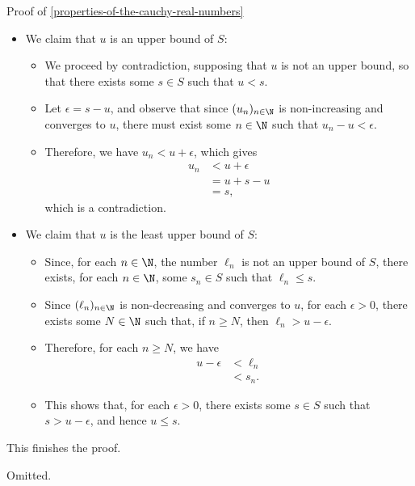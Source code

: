\begin{Proof}{Proof of \cref{properties-of-the-cauchy-real-numbers}}
\begin{itemize}
\begin{itemize}
                    so $(\ell_{n})_{n\in\N}$ converges to $u$.
            \end{itemize}
        \item We claim that $u$ is an upper bound of $S$:
            \begin{itemize}
                \item We proceed by contradiction, supposing that $u$ is not an upper bound, so that there exists some $s\in S$ such that $u\lt s$.
                \item Let $\epsilon=s-u$, and observe that since $(u_{n})_{n\in\N}$ is non-increasing and converges to $u$, there must exist some $n\in\N$ such that $u_{n}-u\lt\epsilon$.
                \item Therefore, we have $u_{n}\lt u+\epsilon$, which gives
                    \begin{align*}
                        u_{n} &\lt u+\epsilon\\
                              &=     u+s-u\\
                              &=     s,
                    \end{align*}
                    which is a contradiction.
            \end{itemize}
        \item We claim that $u$ is the least upper bound of $S$:
            \begin{itemize}
                \item Since, for each $n\in\N$, the number $\ell_{n}$ is not an upper bound of $S$, there exists, for each $n\in\N$, some $s_{n}\in S$ such that $\ell_{n}\leq s$.
                \item Since $(\ell_{n})_{n\in\N}$ is non-decreasing and converges to $u$, for each $\epsilon\gt0$, there exists some $N\in\N$ such that, if $n\geq N$, then $\ell_{n}\gt u-\epsilon$.
                \item Therefore, for each $n\geq N$, we have
                    \begin{align*}
                        u-\epsilon &\lt \ell_{n}\\
                                   &\lt s_{n}.
                    \end{align*}
                \item This shows that, for each $\epsilon\gt0$, there exists some $s\in S$ such that $s\gt u-\epsilon$, and hence $u\leq s$.
            \end{itemize}
    \end{itemize}
    This finishes the proof.

    Omitted.
\end{Proof}
